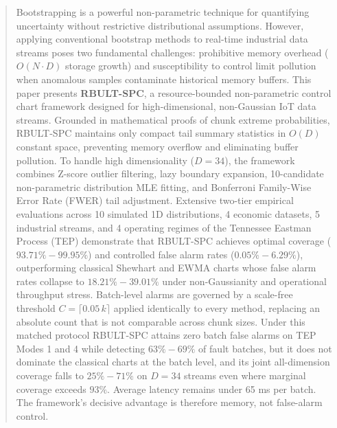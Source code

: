 \documentclass[a4paper,fleqn]{cas-sc}
\begin{document}
\begin{abstract}
Bootstrapping is a powerful non-parametric technique for quantifying uncertainty without restrictive distributional assumptions. However, applying conventional bootstrap methods to real-time industrial data streams poses two fundamental challenges: prohibitive memory overhead ($O(N \cdot D)$ storage growth) and susceptibility to control limit pollution when anomalous samples contaminate historical memory buffers. This paper presents \textbf{RBULT-SPC}, a resource-bounded non-parametric control chart framework designed for high-dimensional, non-Gaussian IoT data streams. Grounded in mathematical proofs of chunk extreme probabilities, RBULT-SPC maintains only compact tail summary statistics in $O(D)$ constant space, preventing memory overflow and eliminating buffer pollution. To handle high dimensionality ($D=34$), the framework combines Z-score outlier filtering, lazy boundary expansion, 10-candidate non-parametric distribution MLE fitting, and Bonferroni Family-Wise Error Rate (FWER) tail adjustment. Extensive two-tier empirical evaluations across 10 simulated 1D distributions, 4 economic datasets, 5 industrial streams, and 4 operating regimes of the Tennessee Eastman Process (TEP) demonstrate that RBULT-SPC achieves optimal coverage ($93.71\% - 99.95\%$) and controlled false alarm rates ($0.05\% - 6.29\%$), outperforming classical Shewhart and EWMA charts whose false alarm rates collapse to $18.21\% - 39.01\%$ under non-Gaussianity and operational throughput stress. Batch-level alarms are governed by a scale-free threshold $C = \lceil 0.05\,k \rceil$ applied identically to every method, replacing an absolute count that is not comparable across chunk sizes. Under this matched protocol RBULT-SPC attains zero batch false alarms on TEP Modes 1 and 4 while detecting $63\%-69\%$ of fault batches, but it does not dominate the classical charts at the batch level, and its joint all-dimension coverage falls to $25\%-71\%$ on $D=34$ streams even where marginal coverage exceeds $93\%$. Average latency remains under 65 ms per batch. The framework's decisive advantage is therefore memory, not false-alarm control.
\end{abstract}
\end{document}
